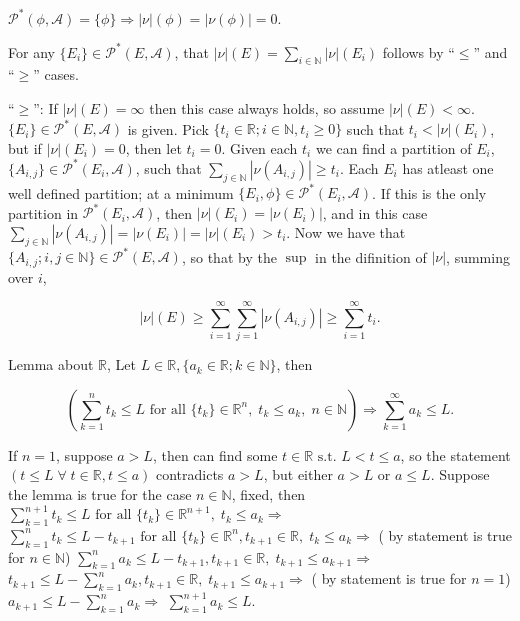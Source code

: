 \documentclass[12pt]{article}
\newcommand{\partset}[1]{ \mathcal{P}^{*}(#1) }
\newcommand{\st}[0]{ \textrm{ s.t. } }
\newcommand{\fall}[0] { \textrm{ for all } }
\newcommand{\nats}[0] { \mathbb{N}}
\newcommand{\reals}[0] { \mathbb{R}}
\newcommand{\A}[0] { \mathcal{A} }
\newcommand{\rimply}[0] { \Rightarrow }
\begin{document}
\noindent
 $\partset{\phi, \A} = \{ \phi \} \rimply |\nu|(\phi) = |\nu(\phi)| = 0$. 

\noindent 
For any $\{ E_i \} \in \partset{E, \A}$, that $|\nu|(E) = \sum_{i \in \nats} |\nu|(E_i)$ follows by ``$\le$'' and ``$\ge$'' cases. \\


\noindent


\noindent
``$\ge$'': If $|\nu|(E) = \infty$ then this case always holds, so assume $|\nu|(E) < \infty$. $\{ E_i \} \in \partset{ E, \A }$ is given. Pick $\{ t_i \in \reals; i \in \nats, t_i \ge 0 \}$ such that $t_i < |\nu|(E_i)$, but if $|\nu|(E_i) = 0$, then let $t_i = 0$. Given each $t_i$ we can find a partition of $E_i$, $\{A_{i,j} \} \in \partset{E_i, \A}$, such that $\sum_{j \in \nats} |\nu(A_{i,j})| \ge t_i$. Each $E_i$ has atleast one well defined partition; at a minimum $\{E_i, \phi \} \in \partset{E_i, \A}$. If this is the only partition in $\partset{E_i, \A}$, then $|\nu|(E_i) = |\nu(E_i)|$, and in this case $\sum_{j \in \nats} |\nu(A_{i,j})| = |\nu(E_i)| = |\nu|(E_i) > t_i$.  Now we have that $\{ A_{i,j}; i,j \in \nats \} \in \partset{E, \A}$, so that by the $\sup$ in the difinition of $|\nu|$, summing over $i$,

$$    |\nu|(E) \ge \sum_{i =1 }^\infty \sum_{j =1}^\infty |\nu(A_{i,j})| \ge \sum_{i=1}^\infty t_i. $$

\noindent
Lemma about $\reals$, Let $L \in \reals, \{ a_k \in \reals; k \in \nats \}$, then

$$
\left(  \sum_{k=1}^n t_k \le L  \fall \{ t_k \} \in \reals^n, \; t_k \le a_k, \; n \in \nats  \right) \rimply \sum_{k = 1} ^ \infty a_k \le L.
$$

\noindent
If $n=1$, suppose $a > L$, then can find some $t \in \reals \st L < t \le a$, so the statement $ \left( t \le L  \; \forall \; t \in \reals, t \le a \right)$ contradicts $a > L$, but either $a > L$ or  $a \le L$. Suppose the lemma is true for the case $n \in \nats$, fixed, then $  \sum_{k=1}^{n+1} t_k \le L  \fall \{ t_k \} \in \reals^{n+1}, \; t_k \le a_k  \rimply$
$  \sum_{k=1}^{n} t_k \le L-t_{k+1}  \fall \{ t_k \} \in \reals^{n}, t_{k+1} \in \reals, \; t_k \le a_k \rimply$ ( by statement is true for $n \in \nats$)
$  \sum_{k=1}^{n} a_k \le L-t_{k+1},  t_{k+1} \in \reals, \; t_{k+1} \le a_{k+1} \rimply$
$  t_{k+1} \le L-\sum_{k=1}^{n} a_k,  t_{k+1} \in \reals, \; t_{k+1} \le a_{k+1} \rimply$
( by statement is true for $n=1$) $a_{k+1} \le L-\sum_{k=1}^{n} a_k \rimply $  $\sum_{k=1}^{n+1} a_k \le L$. \\
\end{document}

